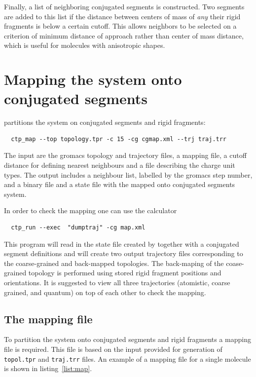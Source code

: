 Finally, a list of neighboring conjugated segments is constructed. Two segments are added to this list if the distance between centers of mass of {\em any} their rigid fragments is below a certain cutoff. This allows neighbors to be selected on a criterion of minimum distance of approach rather than center of mass distance, which is useful for molecules with anisotropic shapes.

\section{Mapping the system onto conjugated segments}

\ctpmap partitions the system on conjugated segments and rigid fragments:
\begin{verbatim}
  ctp_map --top topology.tpr -c 15 -cg cgmap.xml --trj traj.trr
\end{verbatim}
The input are the gromacs topology and trajectory files, a mapping file, a cutoff distance for defining nearest neighbours and a file describing the charge unit types. The output includes a neighbour list, labelled by the gromacs step number, and a binary 
file and a state file with the mapped onto conjugated segments system. 

In order to check the mapping one can use the \dumptraj calculator
\begin{verbatim}
  ctp_run --exec  "dumptraj" -cg map.xml 
\end{verbatim}

This program will read in the state file created by \ctpmap together with a conjugated segment definitions and will create two output trajectory files corresponding to the coarse-grained and back-mapped topologies. The back-maping of the coase-grained topology is performed using stored rigid fragment positions and orientations. It is suggested to view all three trajectories (atomistic, coarse grained, and quantum) on top of each other to check the mapping.

\subsection{The mapping file}
To partition the system onto conjugated segments and rigid fragments a mapping \xml file is required. This file is based on the input provided for generation of \texttt{topol.tpr} and \texttt{traj.trr} files. An example of a mapping file for a single \dcvt molecule is shown in listing~\ref{list:map}. 

